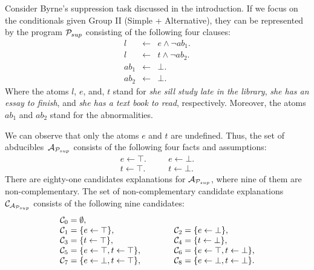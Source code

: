 \newpage
\vspace*{\fill}
\begin{tcolorbox}
\begin{example}
\label{example:suppression}
\normalfont 
Consider Byrne's suppression task discussed in the introduction. If we focus on the conditionals given Group II (Simple + Alternative), they can be represented by the program $\mathcal{P}_{sup}$ consisting of the following four clauses:
\[
\begin{array}{lcl}
l & \leftarrow & e \wedge \neg ab_1. \\
l & \leftarrow & t \wedge \neg ab_2. \\
ab_1 & \leftarrow & \bot. \\
ab_2 & \leftarrow & \bot.
\end{array}
\]
Where the atoms $l$, $e$, and, $t$ stand for \textit{she sill study late in the library}, \textit{she has an essay to finish}, and \textit{she has a text book to read}, respectively. Moreover, the atoms $ab_1$ and $ab_2$ stand for the abnormalities.

We can observe that only the atoms $e$ and $t$ are undefined. Thus, the set of abducibles~$\mathcal{A}_{\mathcal{P}_{sup}}$ consists of the following four facts and assumptions:
\[
\begin{array}{ccc}
e \leftarrow \top. & \quad & e \leftarrow \bot. \\
t \leftarrow \top. & \quad & t \leftarrow \bot.
\end{array}
\]
There are eighty-one candidates explanations for $\mathcal{A}_{\mathcal{P}_{sup}}$, where nine of them are non-complementary. The set of non-complementary candidate explanations $\mathcal{C}_{\mathcal{A}_{\mathcal{P}_{sup}}}$ consists of the following nine candidates:
\[
\begin{array}{lcl}
\mathcal{C}_0 = \emptyset, &\quad\quad& \\
\mathcal{C}_1 = \{e \leftarrow \top\}, &\quad\quad& \mathcal{C}_2 = \{e \leftarrow \bot\}, \\
\mathcal{C}_3 = \{t \leftarrow \top\}, &\quad\quad& \mathcal{C}_4 = \{t \leftarrow \bot\}, \\
\mathcal{C}_5 = \{e \leftarrow \top, t \leftarrow \top\}, &\quad\quad& \mathcal{C}_6 = \{e \leftarrow \top, t \leftarrow \bot\}, \\
\mathcal{C}_7 = \{e \leftarrow \bot, t \leftarrow \top\}, &\quad\quad&\mathcal{C}_8 = \{e \leftarrow \bot, t \leftarrow \bot\}. \\
\end{array}
\]
\end{example}
\end{tcolorbox}
\vspace*{\fill}
\newpage

